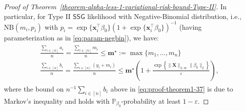 \documentclass[10pt,a4paper]{amsart}
\begin{document}
\begin{proof}[Proof of Theorem~\ref{theorem-alpha-less-1-variational-risk-bound-Type-II}]
In particular, for Type II $\mathsf{SSG}$ likelihood with Negative-Binomial distribution, i.e., $\mathrm{NB}(m_i, p_i)$ with $p_i = \exp\{\mathbf{x}_i^{\top}\beta_0\}(1 + \exp\{\mathbf{x}_i^{\top}\beta_0\})^{-1}$ (having parameterization as in \eqref{eq:param-negbin}), we have:
\begin{align}\label{eq:proof-theorem1-37}
    \begin{split}
        &\frac{\sum_{i\in[n]} a_i}{n} = \frac{\sum_{i\in [n]}m_i}{n} \leq \mathbf{m}^{\star} := \max\{m_1, \ldots, m_n\}\\
        &\frac{\sum_{i\in [n]}b_i}{n} = \frac{\sum_{i\in [n]}(y_i+m_i)}{n} \leq \mathbf{m}^{\star}\left(1 + \frac{\exp\left\{\lVert \mathbf{X}\rVert_{2, \infty}\lVert \beta_0\rVert_2\right\}}{\varepsilon}\right),
    \end{split}
\end{align}
where the bound on $n^{-1}\sum_{i\in [n]}b_i$ above in \eqref{eq:proof-theorem1-37} is due to Markov's inequality and holds with $\mathbb{P}_{\beta_0}$-probability at least $1-\varepsilon$.


\end{proof}
\end{document}
